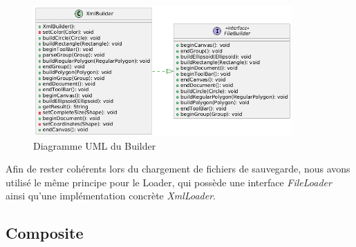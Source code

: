 \documentclass{article}
\begin{document}
\begin{figure}[h]
    \centering
    \includegraphics[width=\textwidth,height=5.0cm,keepaspectratio]{builder.png}
    \caption{Diagramme UML du Builder}
    \label{Builder}
\end{figure}
\FloatBarrier

Afin de rester cohérents lors du chargement de fichiers de sauvegarde, nous avons utilisé le même principe pour le Loader,
qui possède une interface \textit{FileLoader} ainsi qu'une implémentation concrète \textit{XmlLoader}.

\subsection{Composite}
\end{document}
